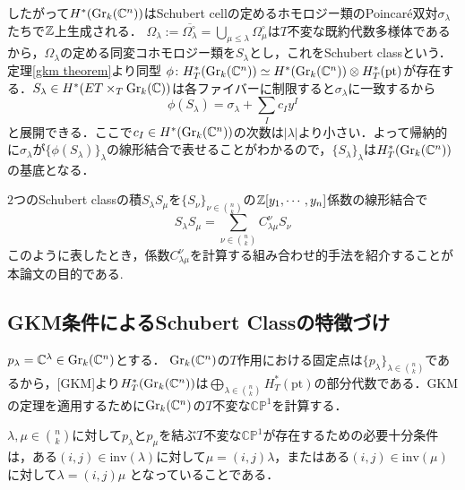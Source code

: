 したがって$H^*(\text{Gr}_k(\mathbb{C}^n))$はSchubert cellの定めるホモロジー類のPoincar\'e双対$\sigma_\lambda$たちで$\mathbb{Z}$上生成される．
$\Omega_\lambda:=\overline{\Omega_\lambda^\circ}=\bigcup_{\mu\leq\lambda}\Omega_\mu^\circ$は$T$不変な既約代数多様体であるから，$\Omega_\lambda$の定める同変コホモロジー類を$S_\lambda$とし，これをSchubert classという．
定理\ref{gkm theorem}より同型
$\phi\colon H^*_T(\text{Gr}_k(\mathbb{C}^n))\simeq H^*(\text{Gr}_k(\mathbb{C}^n))\otimes H^*_T(\text{pt})$が存在する．$S_\lambda\in H^*(ET\times_T\text{Gr}_k(\mathbb{C}))$は各ファイバーに制限すると$\sigma_\lambda$に一致するから
\[
\phi(S_\lambda) = \sigma_\lambda + \sum_{I}c_Iy^I
\]
と展開できる．ここで$c_I\in H^*(\text{Gr}_k(\mathbb{C}^n))$の次数は$|\lambda|$より小さい．よって帰納的に$\sigma_\lambda$が$\{\phi(S_\lambda)\}_\lambda$の線形結合で表せることがわかるので，$\{S_\lambda\}_\lambda$は$H^*_T(\text{Gr}_k(\mathbb{C}^n))$の基底となる．


$2$つのSchubert classの積$S_\lambda S_\mu$を$\{S_\nu\}_{\nu\in\binom{n}{k}}$の$\mathbb{Z}[y_1,\cdots,y_n]$係数の線形結合で
\begin{equation}\label{LRcoeff}
  S_\lambda S_\mu=\sum_{\nu\in\binom{n}{k}}C^\nu_{\lambda\mu}S_\nu
\end{equation}
このように表したとき，係数$C^{\nu}_{\lambda\mu}$を計算する組み合わせ的手法を紹介することが本論文の目的である.





\subsection{GKM条件によるSchubert Classの特徴づけ}

$p_\lambda = \mathbb{C}^\lambda\in\text{Gr}_k(\mathbb{C}^n)$とする．
$\text{Gr}_k(\mathbb{C}^n)$の$T$作用における固定点は$\{p_\lambda\}_{\lambda\in\binom{n}{k}}$であるから，[GKM]より$H^*_T(\text{Gr}_k(\mathbb{C}^n))$は$\bigoplus_{\lambda\in\binom{n}{k}}H^*_T(\text{pt})$の部分代数である．GKMの定理を適用するために$\text{Gr}_k(\mathbb{C}^n)$の$T$不変な$\mathbb{CP}^1$を計算する．

\begin{prop}
  $\lambda,\mu\in\binom{n}{k}$に対して$p_\lambda$と$p_\mu$を結ぶ$T$不変な$\mathbb{CP}^1$が存在するための必要十分条件は，ある$(i, j)\in\text{inv}(\lambda)$に対して$\mu = (i, j)\lambda$，またはある$(i,j)\in\text{inv}(\mu)$に対して$\lambda = (i, j)\mu$
  となっていることである．
\end{prop}

